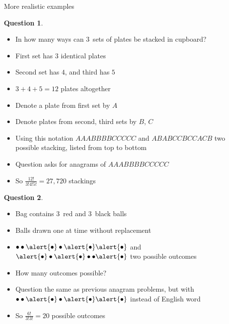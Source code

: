 \documentclass{beamer}
\theoremstyle{definition}
\newtheorem{question}{Question}
\begin{document}
\begin{frame}{More realistic examples}
\begin{question}
\begin{itemize}
\item In how many ways can $3$~sets of plates be stacked in cupboard?
\item First set has $3$ identical plates
\item Second set has $4$, and third has $5$
\end{itemize}
\end{question}
\begin{itemize}
\item $3+4+5=12$ plates altogether
\item Denote a plate from first set by $A$
\item Denote plates from second, third sets by $B$, $C$
\item Using this notation
$AAABBBBCCCCC$ and $ABABCCBCCACB$ two possible stacking,
listed from top to bottom
\item Question asks for anagrams of $AAABBBBCCCCC$
\item So $\frac{12!}{3!4!5!}=27,720$ stackings
\end{itemize}
\end{frame}

\begin{frame}
\begin{question}
\begin{itemize}
\item Bag contains $3$~red and $3$~black balls
\item Balls drawn one at time without replacement
\item $\bullet\bullet\alert{\bullet}\bullet\alert{\bullet}\alert{\bullet}$
and $\alert{\bullet}\bullet\alert{\bullet}\bullet\bullet\alert{\bullet}$
two possible outcomes
\item How many outcomes possible?
\end{itemize}
\end{question}
\begin{itemize}
\item Question the same as previous anagram problems,
but with 
$\bullet\bullet\alert{\bullet}\bullet\alert{\bullet}\alert{\bullet}$
instead of English word
\item So $\frac{6!}{3!3!}=20$ possible outcomes
\end{itemize}
\end{frame}
\end{document}
